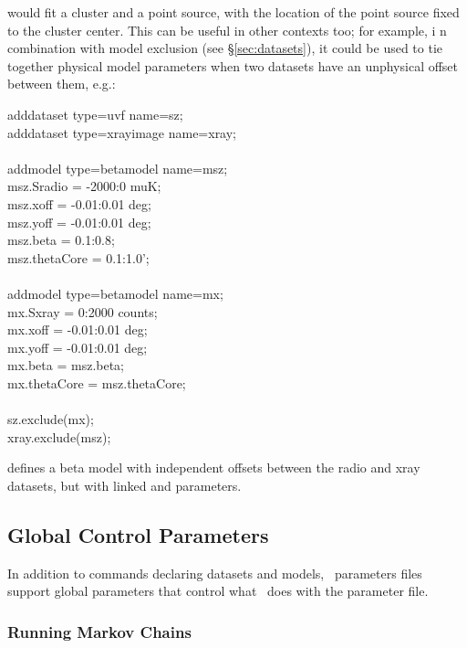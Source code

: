 would fit a cluster and a point source, with the location of the point
source fixed to the cluster center.  This can be useful in other
contexts too; for example, i n combination with model exclusion (see
\S\ref{sec:datasets}), it could be used to tie together physical model
parameters when two datasets have an unphysical offset between them,
e.g.:

\begin{myindentpar}{3cm}
adddataset type=uvf name=sz;\\
adddataset type=xrayimage name=xray;\\
\\
addmodel type=betamodel name=msz;\\
msz.Sradio = -2000:0 muK;\\
msz.xoff = -0.01:0.01 deg;\\
msz.yoff = -0.01:0.01 deg;\\
msz.beta = 0.1:0.8;\\
msz.thetaCore = 0.1:1.0';\\
\\
addmodel type=betamodel name=mx;\\
mx.Sxray   = 0:2000 counts;\\
mx.xoff = -0.01:0.01 deg;\\
mx.yoff = -0.01:0.01 deg;\\
mx.beta = msz.beta;\\
mx.thetaCore = msz.thetaCore;\\
\\
sz.exclude(mx);\\
xray.exclude(msz);
\end{myindentpar}

defines a beta model with independent offsets between the radio and
xray datasets, but with linked  and 
parameters.

\subsection{Global Control Parameters}
\label{sec:control}

In addition to commands declaring datasets and models,
\climax\ parameters files support global parameters that control what
\climax\ does with the parameter file.  

\subsubsection{Running Markov Chains}

